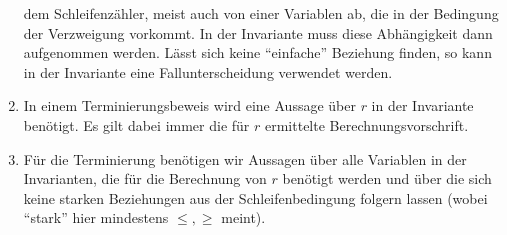 \documentclass[a4paper,8pt,landscape]{extarticle}
\begin{document}
\begin{multicols*}{3}
\begin{enumerate}
dem Schleifenzähler, meist auch von einer Variablen ab, die in der
Bedingung der Verzweigung vorkommt. In der Invariante muss
diese Abhängigkeit dann aufgenommen werden. Lässt sich keine
“einfache” Beziehung finden, so kann in der Invariante eine
Fallunterscheidung verwendet werden.
      \item In einem Terminierungsbeweis wird eine Aussage über $r$ in der
Invariante benötigt. Es gilt dabei immer die für $r$ ermittelte
Berechnungsvorschrift.
      \item Für die Terminierung benötigen wir Aussagen über alle Variablen in
der Invarianten, die für die Berechnung von $r$ benötigt werden und
über die sich keine starken Beziehungen aus der Schleifenbedingung
folgern lassen (wobei “stark” hier mindestens $\leq, \geq$ meint).
    \end{enumerate}

    
  \end{multicols*}
\end{document}
